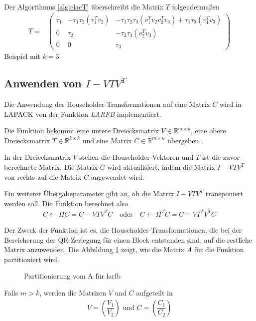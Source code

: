 Der Algorithmus \ref{alg:clacT} überschreibt die Matrix $T$ folgendermaßen
\begin{align*}
T =&
\begin{pmatrix}
\tau_1 & -\tau_1 \tau_2 (v_1^T v_2 ) & - \tau_1 \tau_2  \tau_3 (v_1^T v_2 v_2^T v_3) + \tau_1 \tau_3  (v_1^T v_3)\\ 
0 & \tau_2 &  -\tau_2 \tau_3  (v_2^T v_3)\\
0 & 0 & \tau_3
\end{pmatrix}
\end{align*}
Beispiel mit $k=3$

\subsection{Anwenden von $I - VTV^T$} \label{applyT}
Die Anwendung der Householder-Transformationen auf eine Matrix $C$ wird in LAPACK von der  Funktion \textit{LARFB} implementiert.

Die Funktion bekommt eine untere Dreiecksmatrix $V \in \mathbb{R}^{m \times k}$, eine obere Dreiecksmatrix $T \in \mathbb{R}^{k \times k}$ und eine Matrix $C \in \mathbb{R}^{m \times n }$ übergeben.

In der Dreiecksmatrix $V$ stehen die Householder-Vektoren und $T$ ist die zuvor berechnete Matrix.
Die Matrix $C$ wird aktualisiert, indem die Matrix $I - V T V^T $ von rechts auf die Matrix $ C $ angewendet wird. 

Ein weiterer Übergabeparameter gibt an, ob die Matrix  $I - V T V^T $ transponiert werden soll.
Die Funktion berechnet also
\begin{align}
	C \leftarrow H C = C - V T V^T C \quad \text{oder} \quad 	C \leftarrow H^T C = C - V T^T V^T C	\label{eq:larfb}
\end{align}

Der Zweck der Funktion ist es, die Householder-Transformationen, die bei der Bereicherung der QR-Zerlegung für einen Block entstanden sind, auf die restliche Matrix anzuwenden.
Die Abbildung \ref{fig:patrA} zeigt, wie die Matrix $A$ für die Funktion partitioniert wird.
\begin{figure} [H]
	\centering
	
	\caption{Partitionierung vom A für larfb}
	\label{fig:patrA}
\end{figure}
Falls $m > k $, werden die Matrizen $V$ und $C$ aufgeteilt in
\begin{align}
	V=\left(\dfrac{V_1}{V_2}\right)  \text{  und  } C=\left(\dfrac{C_1}{C_2}\right)
	\label{eq:aufteilen}
\end{align}

